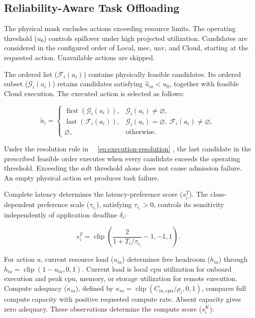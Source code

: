 \documentclass[journal]{IEEEtran}
\providecommand*{\algorithmautorefname}{Algorithm}
\providecommand*{\figureautorefname}{Figure}
\providecommand*{\subfigureautorefname}{Figure}
\providecommand*{\Autoref}[1]{%
  \begingroup
  \def\sectionautorefname{Section}%
  \def\subsectionautorefname{Subsection}%
  \def\subsubsectionautorefname{Subsubsection}%
  \def\algorithmautorefname{Algorithm}%
  \def\figureautorefname{Figure}%
  \def\subfigureautorefname{Figure}%
 ~\autoref{#1}%
  \endgroup
}
\newcommand{\Autoref}[1]{Eq.~\Autoref{#1}}
\begin{document}
\subsection{Reliability-Aware Task Offloading}
\label{subsec:reliability-aware-offloading}

The physical mask excludes actions exceeding resource limits. The operating threshold (\(u_0\)) controls spillover under high projected utilization. Candidates are considered in the configured order of Local, \acs{mec}, \acs{uav}, and Cloud, starting at the requested action. Unavailable actions are skipped.

The ordered list (\(\mathcal F_i(a_i)\)) contains physically feasible candidates. Its ordered subset (\(\mathcal G_i(a_i)\)) retains candidates satisfying \(\widehat u_{ia}<u_0\), together with feasible Cloud execution. The executed action is selected as follows:

\begin{equation}
\label{eq:execution-resolution}
\tilde a_i=
\begin{cases}
\operatorname{first}(\mathcal G_i(a_i)),
&\mathcal G_i(a_i)\neq\varnothing,\\
\operatorname{last}(\mathcal F_i(a_i)),
&\mathcal G_i(a_i)=\varnothing,\
\mathcal F_i(a_i)\neq\varnothing,\\
\varnothing,
&\text{otherwise}.
\end{cases}
\end{equation}

Under the resolution rule in~\Autoref{eq:execution-resolution}, the last candidate in the prescribed feasible order executes when every candidate exceeds the operating threshold. Exceeding the soft threshold alone does not cause admission failure. An empty physical action set produces task failure.

Complete latency determines the latency-preference score (\(s_i^{T}\)). The class-dependent preference scale (\(\tau_{c_i}\)), satisfying \(\tau_{c_i}>0\), controls its sensitivity independently of application deadline \(\delta_i\):

\begin{equation}
\label{eq:latency-preference}
s_i^{T}
=
\operatorname{clip}
\left(
\frac{2}{1+T_i/\tau_{c_i}}-1,
-1,1
\right).
\end{equation}

For action \(a\), current resource load (\(u_{ia}\)) determines free headroom (\(h_{ia}\)) through \(h_{ia}=\operatorname{clip}(1-u_{ia},0,1)\). Current load is local \acs{cpu} utilization for onboard execution and peak \acs{cpu}, memory, or storage utilization for remote execution. Compute adequacy (\(\kappa_{ia}\)), defined by \(\kappa_{ia}=\operatorname{clip}(C_{ia,\mathrm{cpu}}/\rho_i,0,1)\), compares full compute capacity with positive requested compute rate. Absent capacity gives zero adequacy. These observations determine the compute score (\(s_i^{K}\)):
\end{document}
